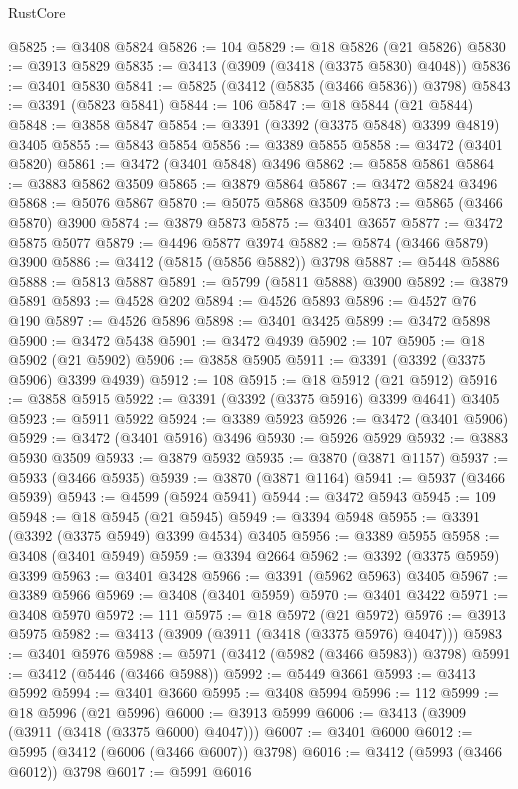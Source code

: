 \begin{lexlean}{RustCore}
\begin{coremodule}
@5825 := @3408 @5824
@5826 := 104
@5829 := @18 @5826 (@21 @5826)
@5830 := @3913 @5829
@5835 := @3413 (@3909 (@3418 (@3375 @5830) @4048))
@5836 := @3401 @5830
@5841 := @5825 (@3412 (@5835 (@3466 @5836)) @3798)
@5843 := @3391 (@5823 @5841)
@5844 := 106
@5847 := @18 @5844 (@21 @5844)
@5848 := @3858 @5847
@5854 := @3391 (@3392 (@3375 @5848) @3399 @4819) @3405
@5855 := @5843 @5854
@5856 := @3389 @5855
@5858 := @3472 (@3401 @5820)
@5861 := @3472 (@3401 @5848) @3496
@5862 := @5858 @5861
@5864 := @3883 @5862 @3509
@5865 := @3879 @5864
@5867 := @3472 @5824 @3496
@5868 := @5076 @5867
@5870 := @5075 @5868 @3509
@5873 := @5865 (@3466 @5870) @3900
@5874 := @3879 @5873
@5875 := @3401 @3657
@5877 := @3472 @5875 @5077
@5879 := @4496 @5877 @3974
@5882 := @5874 (@3466 @5879) @3900
@5886 := @3412 (@5815 (@5856 @5882)) @3798
@5887 := @5448 @5886
@5888 := @5813 @5887
@5891 := @5799 (@5811 @5888) @3900
@5892 := @3879 @5891
@5893 := @4528 @202
@5894 := @4526 @5893
@5896 := @4527 @76 @190
@5897 := @4526 @5896
@5898 := @3401 @3425
@5899 := @3472 @5898
@5900 := @3472 @5438
@5901 := @3472 @4939
@5902 := 107
@5905 := @18 @5902 (@21 @5902)
@5906 := @3858 @5905
@5911 := @3391 (@3392 (@3375 @5906) @3399 @4939)
@5912 := 108
@5915 := @18 @5912 (@21 @5912)
@5916 := @3858 @5915
@5922 := @3391 (@3392 (@3375 @5916) @3399 @4641) @3405
@5923 := @5911 @5922
@5924 := @3389 @5923
@5926 := @3472 (@3401 @5906)
@5929 := @3472 (@3401 @5916) @3496
@5930 := @5926 @5929
@5932 := @3883 @5930 @3509
@5933 := @3879 @5932
@5935 := @3870 (@3871 @1157)
@5937 := @5933 (@3466 @5935)
@5939 := @3870 (@3871 @1164)
@5941 := @5937 (@3466 @5939)
@5943 := @4599 (@5924 @5941)
@5944 := @3472 @5943
@5945 := 109
@5948 := @18 @5945 (@21 @5945)
@5949 := @3394 @5948
@5955 := @3391 (@3392 (@3375 @5949) @3399 @4534) @3405
@5956 := @3389 @5955
@5958 := @3408 (@3401 @5949)
@5959 := @3394 @2664
@5962 := @3392 (@3375 @5959) @3399
@5963 := @3401 @3428
@5966 := @3391 (@5962 @5963) @3405
@5967 := @3389 @5966
@5969 := @3408 (@3401 @5959)
@5970 := @3401 @3422
@5971 := @3408 @5970
@5972 := 111
@5975 := @18 @5972 (@21 @5972)
@5976 := @3913 @5975
@5982 := @3413 (@3909 (@3911 (@3418 (@3375 @5976) @4047)))
@5983 := @3401 @5976
@5988 := @5971 (@3412 (@5982 (@3466 @5983)) @3798)
@5991 := @3412 (@5446 (@3466 @5988))
@5992 := @5449 @3661
@5993 := @3413 @5992
@5994 := @3401 @3660
@5995 := @3408 @5994
@5996 := 112
@5999 := @18 @5996 (@21 @5996)
@6000 := @3913 @5999
@6006 := @3413 (@3909 (@3911 (@3418 (@3375 @6000) @4047)))
@6007 := @3401 @6000
@6012 := @5995 (@3412 (@6006 (@3466 @6007)) @3798)
@6016 := @3412 (@5993 (@3466 @6012)) @3798
@6017 := @5991 @6016

\end{coremodule}
\end{lexlean}
